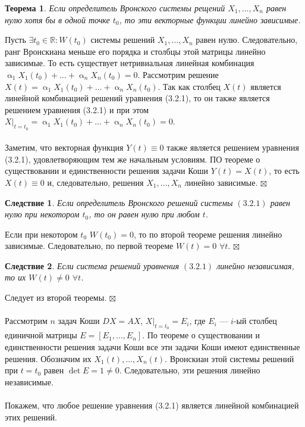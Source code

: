 \documentclass[a4paper, 12pt]{report}
\newenvironment{Proof} %
{\par\noindent{$\blacklozenge$}} %
{\hfill$\scriptstyle\boxtimes$}
\newcommand{\Rm}{\mathbb{R}}
\renewcommand{\alpha}{\upalpha}
\newtheorem*{theorem}{Теорема}
\newtheorem*{cor}{Следствие}
\begin{document}
\begin{theorem}
	Если определитель Вронского системы рещений  $X_1,\ldots,X_n$ равен нулю хотя бы в одной точке $t_0$, то эти векторные функции линейно зависимые.
\end{theorem}\begin{Proof}
Пусть $\exists t_0 \in \Rm : W(t_0)$ системы решений $X_1,\ldots,X_n$ равен нулю. Следовательно, ранг Вронскиана меньше его порядка и столбцы этой матрицы линейно зависимые. То есть существует нетривиальная линейная комбинация $\alpha_1X_1(t_0) + \ldots +  \alpha_nX_n(t_0) = 0$. Рассмотрим решение $X(t) =  \alpha_1X_1(t_0) + \ldots +  \alpha_nX_n(t_0)$. Так как столбец $X(t)$ является линейной комбинацией решений уравнения (3.2.1), то он также является решением уравнения (3.2.1) и при этом $X|_{t=t_0} =  \alpha_1X_1(t_0) + \ldots +  \alpha_nX_n(t_0) = 0.$\\\\
Заметим, что векторная функция $Y(t)\equiv 0$ также является решением уравнения (3.2.1), удовлетворяющим тем же начальным условиям. ПО теореме о существовании и единственности решения задачи Коши $Y(t) = X(t)$, то есть $X(t)\equiv 0$ и, следовательно, решения $X_1,\ldots,X_n$ линейно зависимые.
\end{Proof}
\begin{cor}
	Если определитель Вронского решений системы $(3.2.1)$ равен нулю при некотором $t_0$, то он равен нулю при любом $t$.
\end{cor}\begin{Proof}
Если при некотором $t_0$ $W(t_0) = 0 $, то по второй теореме решения линейно зависимые. Следовательно, по первой теореме $W(t) = 0$ $\forall t$.
\end{Proof}\begin{cor}
Если система решений уравнения $(3.2.1)$ линейно независимая, то их $W(t) \ne 0$ $\forall t$.
\end{cor}\begin{Proof}
Следует из второй теоремы.
\end{Proof}\\\\
Рассмотрим $n$ задач Коши $DX = AX$, $X|_{t=t_0} = E_i$, где $E_i$ --- $i$-ый столбец единичной матрицы $E = [E_1,\ldots, E_n]$. По теореме о существовании и единственности решения задачи Коши все эти задачи Коши имеют единственные решения. Обозначим их $X_1(t),\ldots,X_n(t)$. Вронскиан этой системы решений при $t=t_0$ равен $\det E = 1\ne 0$. Следовательно, эти решения линейно независимые.\\\\ Покажем, что любое решение уравнения (3.2.1) является линейной комбинацией этих решений.
\end{document}
